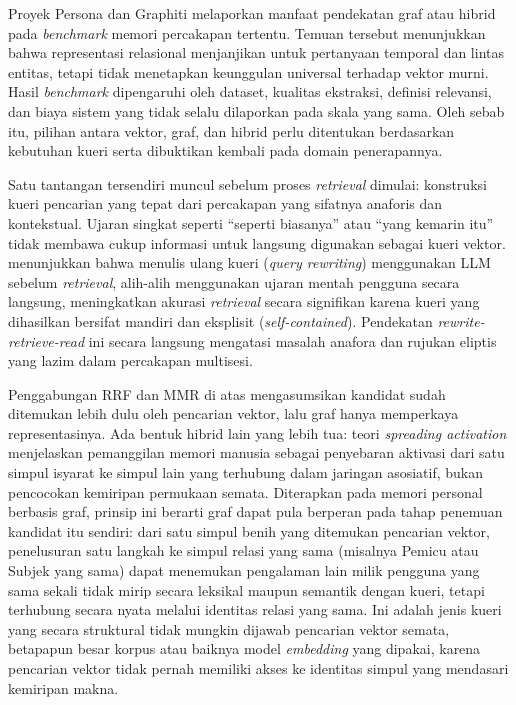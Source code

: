 Proyek Persona \parencite{saxenauts2025persona} dan Graphiti \parencite{rasmussen2025zep} melaporkan manfaat pendekatan graf atau hibrid pada \textit{benchmark} memori percakapan tertentu. Temuan tersebut menunjukkan bahwa representasi relasional menjanjikan untuk pertanyaan temporal dan lintas entitas, tetapi tidak menetapkan keunggulan universal terhadap vektor murni. Hasil \textit{benchmark} dipengaruhi oleh dataset, kualitas ekstraksi, definisi relevansi, dan biaya sistem yang tidak selalu dilaporkan pada skala yang sama. Oleh sebab itu, pilihan antara vektor, graf, dan hibrid perlu ditentukan berdasarkan kebutuhan kueri serta dibuktikan kembali pada domain penerapannya.

Satu tantangan tersendiri muncul sebelum proses \textit{retrieval} dimulai: konstruksi kueri pencarian yang tepat dari percakapan yang sifatnya anaforis dan kontekstual. Ujaran singkat seperti ``seperti biasanya'' atau ``yang kemarin itu'' tidak membawa cukup informasi untuk langsung digunakan sebagai kueri vektor. \textcite{ma2023queryrewriting} menunjukkan bahwa menulis ulang kueri (\textit{query rewriting}) menggunakan LLM sebelum \textit{retrieval}, alih-alih menggunakan ujaran mentah pengguna secara langsung, meningkatkan akurasi \textit{retrieval} secara signifikan karena kueri yang dihasilkan bersifat mandiri dan eksplisit (\textit{self-contained}). Pendekatan \textit{rewrite-retrieve-read} ini secara langsung mengatasi masalah anafora dan rujukan eliptis yang lazim dalam percakapan multisesi.

Penggabungan RRF dan MMR di atas mengasumsikan kandidat sudah ditemukan lebih dulu oleh pencarian vektor, lalu graf hanya memperkaya representasinya. Ada bentuk hibrid lain yang lebih tua: teori \textit{spreading activation} \parencite{collinsloftus1975} menjelaskan pemanggilan memori manusia sebagai penyebaran aktivasi dari satu simpul isyarat ke simpul lain yang terhubung dalam jaringan asosiatif, bukan pencocokan kemiripan permukaan semata. Diterapkan pada memori personal berbasis graf, prinsip ini berarti graf dapat pula berperan pada tahap penemuan kandidat itu sendiri: dari satu simpul benih yang ditemukan pencarian vektor, penelusuran satu langkah ke simpul relasi yang sama (misalnya Pemicu atau Subjek yang sama) dapat menemukan pengalaman lain milik pengguna yang sama sekali tidak mirip secara leksikal maupun semantik dengan kueri, tetapi terhubung secara nyata melalui identitas relasi yang sama. Ini adalah jenis kueri yang secara struktural tidak mungkin dijawab pencarian vektor semata, betapapun besar korpus atau baiknya model \textit{embedding} yang dipakai, karena pencarian vektor tidak pernah memiliki akses ke identitas simpul yang mendasari kemiripan makna.

